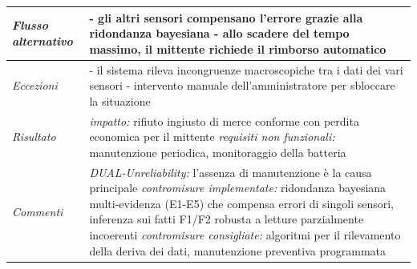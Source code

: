 \begin{longtable}{| >{\columncolor{misuseCol}}p{} | p{} |}
\textit{Flusso alternativo} & - gli altri sensori compensano l'errore grazie alla ridondanza bayesiana \newline - allo scadere del tempo massimo, il mittente richiede il rimborso automatico \\
\hline
\textit{Eccezioni} & - il sistema rileva incongruenze macroscopiche tra i dati dei vari sensori \newline - intervento manuale dell'amministratore per sbloccare la situazione \\
\hline
\textit{Risultato} & \textit{impatto:} rifiuto ingiusto di merce conforme con perdita economica per il mittente \newline \textit{requisiti non funzionali:} manutenzione periodica, monitoraggio della batteria \\
\hline
\textit{Commenti} & \textit{DUAL-Unreliability:} l'assenza di manutenzione è la causa principale \newline \textit{contromisure implementate:} ridondanza bayesiana multi-evidenza (E1-E5) che compensa errori di singoli sensori, inferenza sui fatti F1/F2 robusta a letture parzialmente incoerenti \newline \textit{contromisure consigliate:} algoritmi per il rilevamento della deriva dei dati, manutenzione preventiva programmata \\
\hline
\end{longtable}

